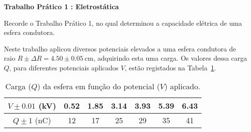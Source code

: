 %
%

\question
\textbf{Trabalho Pr\'{a}tico 1 : Eletrost\'{a}tica}

Recorde o Trabalho Pr\'{a}tico 1, no qual determinou a capacidade el\'{e}trica de uma esfera condutora.

Neste trabalho aplicou diversos potenciais elevados a uma esfera condutora de raio $R\pm\Delta R=4.50\pm0.05~\text{cm}$, adquirindo esta uma carga. Os valores dessa carga $Q$, para diferentes potenciais aplicados $V$, est\~{a}o registados na Tabela~\ref{tab:qesfera}.

\begin{table}[h]
\centering
\caption{\label{tab:qesfera}Carga ($Q$) da esfera em fun\c{c}\~{a}o do potencial ($V$) aplicado.}
\begin{tabular}{|c|c|c|c|c|c|c|}
\hline 
$V\pm 0.01$ (kV) & 0.52 & 1.85 & 3.14 & 3.93 & 5.39 & 6.43 \\ 
\hline 
$Q\pm 1$ (nC) & 12 & 17 & 25 & 29 & 35 & 41 \\ 
\hline 
\end{tabular} 
\end{table}

